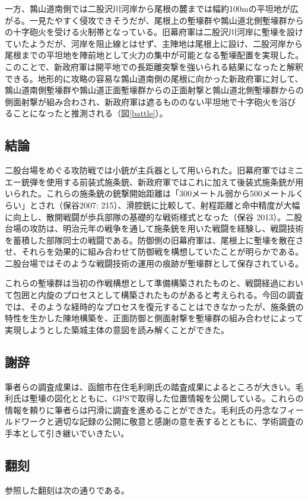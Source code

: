 \documentclass[11pt,report]{jsarticle}
\begin{document}
一方、鶉山道南側では二股沢川河岸から尾根の麓までは幅約100mの平坦地が広がる。一見たやすく侵攻できそうだが、尾根上の塹壕群や鶉山道北側塹壕群からの十字砲火を受ける火制帯となっている。旧幕府軍は二股沢川河岸に塹壕を設けていたようだが、河岸を阻止線とはせず、主陣地は尾根上に設け、二股河岸から尾根までの平坦地を陣前地として火力の集中が可能となる塹壕配置を実現した。このことで、新政府軍は開平地での長距離突撃を強いられる結果になったと解釈できる。地形的に攻略の容易な鶉山道南側の尾根に向かった新政府軍に対して、鶉山道南側塹壕群や鶉山道正面塹壕群からの正面射撃と鶉山道北側塹壕群からの側面射撃が組み合わされ、新政府軍は遮るもののない平坦地で十字砲火を浴びることになったと推測される（図\ref{battle}）。

\subsection{結論}
二股台場をめぐる攻防戦では小銃が主兵器として用いられた。旧幕府軍ではミニエー銃弾を使用する前装式施条銃、新政府軍ではこれに加えて後装式施条銃が用いられた。これらの施条銃の銃撃開始距離は「300メートル弱から500メートルくらい」とされ（保谷2007: 215）、滑腔銃に比較して、射程距離と命中精度が大幅に向上し、散開戦闘が歩兵部隊の基礎的な戦術様式となった（保谷 2013）。二股台場の攻防は、明治元年の戦争を通して施条銃を用いた戦闘を経験し、戦闘技術を蓄積した部隊同士の戦闘である。防御側の旧幕府軍は、尾根上に塹壕を散在させ、それらを効果的に組み合わせて防御戦を構想していたことが明らかである。二股台場ではそのような戦闘技術の運用の痕跡が塹壕群として保存されている。

これらの塹壕群は当初の作戦構想として準備構築されたものと、戦闘経過において包囲と内旋のプロセスとして構築されたものがあると考えられる。今回の調査では、そのような経時的なプロセスを復元することはできなかったが、施条銃の特性を生かした陳地構築を、正面防御と側面射撃を塹壕群の組み合わせによって実現しようとした築城主体の意図を読み解くことができた。

\subsection*{謝辞}
筆者らの調査成果は、函館市在住毛利剛氏の踏査成果によるところが大きい。毛利氏は塹壕の図化とともに、GPSで取得した位置情報を公開している。これらの情報を頼りに筆者らは円滑に調査を進めることができた。毛利氏の丹念なフィールドワークと適切な記録の公開に敬意と感謝の意を表するとともに、学術調査の手本として引き継いでいきたい。

\subsection*{翻刻}
参照した翻刻は次の通りである。
\end{document}
